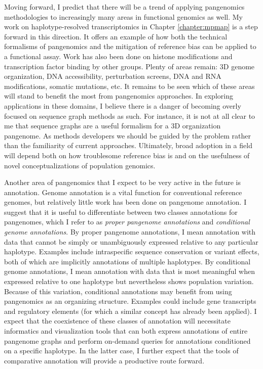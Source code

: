 \documentclass[11pt]{ucthesis}
\begin{document}
Moving forward, I predict that there will be a trend of applying pangenomics methodologies to increasingly many areas in functional genomics as well. My work on haplotype-resolved transcriptomics in Chapter \ref{chapter:mpmap} is a step forward in this direction. It offers an example of how both the technical formalisms of pangenomics and the mitigation of reference bias can be applied to a functional assay. Work has also been done on histone modifications\cite{groza2020personalized} and transcription factor binding\cite{grytten2019graph} by other groups. Plenty of areas remain: 3D genome organization, DNA accessibility, perturbation screens, DNA and RNA modifications, somatic mutations, etc. It remains to be seen which of these areas will stand to benefit the most from pangenomics approaches. In exploring applications in these domains, I believe there is a danger of becoming overly focused on sequence graph methods as such. For instance, it is not at all clear to me that sequence graphs are a useful formalism for a 3D organization pangenome. As methods developers we should be guided by the problem rather than the familiarity of current approaches. Ultimately, broad adoption in a field will depend both on how troublesome reference bias is and on the usefulness of novel conceptualizations of population genomics.

Another area of pangenomics that I expect to be very active in the future is annotation. Genome annotation is a vital function for conventional reference genomes, but relatively little work has been done on pangenome annotation. I suggest that it is useful to differentiate between two classes annotations for pangenomes, which I refer to as \emph{proper pangenome annotations} and \emph{conditional genome annotations}. By proper pangenome annotations, I mean annotation with data that cannot be simply or unambiguously expressed relative to any particular haplotype. Examples include intraspecific sequence conservation or variant effects, both of which are implicitly annotations of multiple haplotypes. By conditional genome annotations, I mean annotation with data that is most meaningful when expressed relative to one haplotype but nevertheless shows population variation. Because of this variation, conditional annotations may benefit from using pangenomics as an organizing structure. Examples could include gene transcripts and regulatory elements (for which a similar concept has already been applied\cite{tognon2021grafimo}). I expect that the coexistence of these classes of annotation will necessitate informatics and visualization tools that can both express annotations of entire pangenome graphs and perform on-demand queries for annotations conditioned on a specific haplotype. In the latter case, I further expect that the tools of comparative annotation will provide a productive route forward\cite{armstrong2019whole}.
\end{document}
